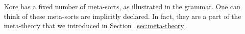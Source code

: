 \documentclass[UTF8,11pt]{article}
\theoremstyle{plain}
\theoremstyle{definition}
\theoremstyle{remark}
\newcommand{\parametric}[2]{{#1}\raisebox{.2ex}{\texttt{\footnotesize{\{}}}#2\raisebox{.2ex}{\texttt{\footnotesize{\}}}}}
\newcommand{\sharpsymbol}{\#}
\newcommand{\KSort}{\texttt{\sharpsymbol Sort}}
\newcommand{\KPatternList}{\texttt{\sharpsymbol PatternList}}
\newcommand{\KPattern}{\texttt{\sharpsymbol Pattern}}
\newcommand{\itsort}{\mathit{sort}}
\newcommand{\itsymbol}{\mathit{symbol}}
\begin{document}
Kore has a fixed number of meta-sorts, as illustrated in the grammar.
One can think of these meta-sorts are implicitly declared.
In fact, they are a part of the meta-theory that we introduced in
Section~\ref{sec:meta-theory}.





\end{document}
